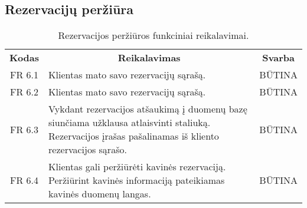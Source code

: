 \documentclass{VUMIFPSkursinis}
\begin{document}
\pagebreak

\subsection{Rezervacijų peržiūra}
\begin{center}
	\begin{table}[H]
	\begin{tabular}{|p{2cm}|p{}|p{}|}
	
	\hline
	    \rowcolor{lightgray}
		\multicolumn{3}{|c|}{Rezervacijų priežiūra}\\
		
	\hline
		\multicolumn{1}{|c|}{{\bfseries Kodas}}&
		\multicolumn{1}{|c|}{{\bfseries Reikalavimas}}&
		\multicolumn{1}{|c|}{{\bfseries Svarba}}\\

	\hline
	
		\multicolumn{1}{|c|}{FR 6.1}&
		{Klientas mato savo rezervacijų sąrašą.}&
		\multicolumn{1}{|c|}{BŪTINA}\\				
	\hline
	
		\multicolumn{1}{|c|}{FR 6.2}&
		{Klientas mato savo rezervacijų sąrašą.}&
		\multicolumn{1}{|c|}{BŪTINA}\\				
	\hline
	
		\multicolumn{1}{|c|}{FR 6.3}&
		{Vykdant rezervacijos atšaukimą į duomenų bazę siunčiama užklausa atlaisvinti staliuką. Rezervacijos įrašas pašalinamas iš kliento rezervacijos sąrašo.}&
		\multicolumn{1}{|c|}{BŪTINA}\\				
	\hline
	
		\multicolumn{1}{|c|}{FR 6.4}&
		{Klientas gali peržiūrėti kavinės rezervaciją. Peržiūrint kavinės informaciją pateikiamas kavinės duomenų langas.}&
		\multicolumn{1}{|c|}{BŪTINA}\\				
	\hline		
	
	\end{tabular}		
	\caption{Rezervacijos peržiūros funkciniai reikalavimai.}
	\label{tabel:RezervacijosPeržiūra}
	\end{table}


\end{center}
\end{document}
